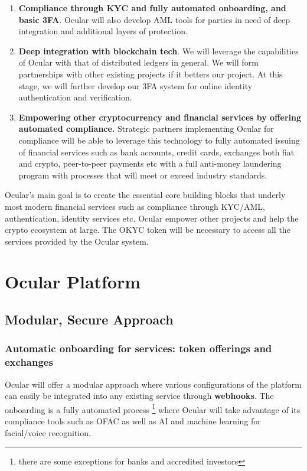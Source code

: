 \documentclass[12pt]{article}
\begin{document}
\begin{enumerate}
\item \textbf{Compliance through KYC and fully automated onboarding, and basic 3FA}. Ocular will also develop AML tools for parties in need of deep integration and additional layers of protection. 

\item \textbf{Deep integration with blockchain tech}. We will leverage the capabilities of Ocular with that of distributed ledgers in general. We will form partnerships with other existing projects if it betters our project. At this stage, we will further develop our 3FA system for online identity authentication and verification. 

\item \textbf{Empowering other cryptocurrency and financial services by offering automated compliance.} Strategic partners implementing Ocular for compliance will be able to leverage this technology to fully automated issuing of financial services such as bank accounts, credit cards, exchanges both fiat and crypto, peer-to-peer payments etc with a full anti-money laundering program with processes that will meet or exceed industry standards. 


\end{enumerate}

Ocular's main goal is to create the essential core building blocks that underly most modern financial services such as compliance through KYC/AML, authentication, identity services etc. Ocular empower other projects and help the crypto ecosystem at large. The OKYC token will be necessary to access all the services provided by the Ocular system.

\clearpage
\section{Ocular Platform}
\subsection{Modular, Secure Approach}
\subsubsection*{Automatic onboarding for services: token offerings and exchanges}
Ocular will offer a modular approach where various configurations of the platform can easily be integrated into any existing service through \textbf{webhooks}. The onboarding is a fully automated process \footnote{there are some exceptions for banks and accredited investors} where Ocular will take advantage of its compliance tools such as OFAC as well as AI and machine learning for facial/voice recognition. 
\end{document}
